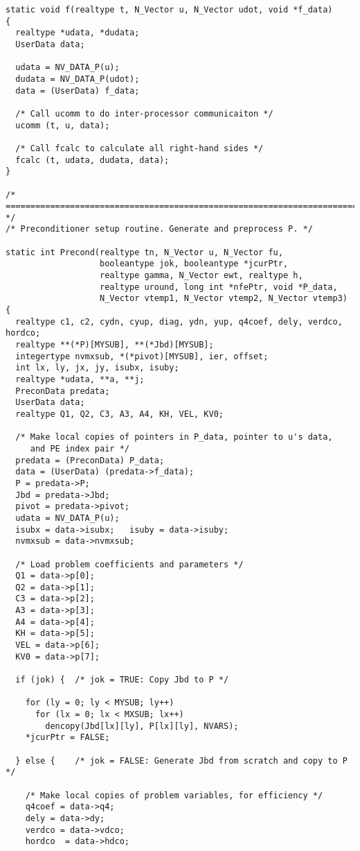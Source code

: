 \begin{verbatim}
static void f(realtype t, N_Vector u, N_Vector udot, void *f_data)
{
  realtype *udata, *dudata;
  UserData data;

  udata = NV_DATA_P(u);
  dudata = NV_DATA_P(udot);
  data = (UserData) f_data;

  /* Call ucomm to do inter-processor communicaiton */
  ucomm (t, u, data);

  /* Call fcalc to calculate all right-hand sides */
  fcalc (t, udata, dudata, data);
}

/* ======================================================================= */
/* Preconditioner setup routine. Generate and preprocess P. */

static int Precond(realtype tn, N_Vector u, N_Vector fu, 
                   booleantype jok, booleantype *jcurPtr, 
                   realtype gamma, N_Vector ewt, realtype h,
                   realtype uround, long int *nfePtr, void *P_data,
                   N_Vector vtemp1, N_Vector vtemp2, N_Vector vtemp3)
{
  realtype c1, c2, cydn, cyup, diag, ydn, yup, q4coef, dely, verdco, hordco;
  realtype **(*P)[MYSUB], **(*Jbd)[MYSUB];
  integertype nvmxsub, *(*pivot)[MYSUB], ier, offset;
  int lx, ly, jx, jy, isubx, isuby;
  realtype *udata, **a, **j;
  PreconData predata;
  UserData data;
  realtype Q1, Q2, C3, A3, A4, KH, VEL, KV0;

  /* Make local copies of pointers in P_data, pointer to u's data,
     and PE index pair */
  predata = (PreconData) P_data;
  data = (UserData) (predata->f_data);
  P = predata->P;
  Jbd = predata->Jbd;
  pivot = predata->pivot;
  udata = NV_DATA_P(u);
  isubx = data->isubx;   isuby = data->isuby;
  nvmxsub = data->nvmxsub;

  /* Load problem coefficients and parameters */
  Q1 = data->p[0];
  Q2 = data->p[1];
  C3 = data->p[2];
  A3 = data->p[3];
  A4 = data->p[4];
  KH = data->p[5];
  VEL = data->p[6];
  KV0 = data->p[7];

  if (jok) {  /* jok = TRUE: Copy Jbd to P */

    for (ly = 0; ly < MYSUB; ly++)
      for (lx = 0; lx < MXSUB; lx++)
        dencopy(Jbd[lx][ly], P[lx][ly], NVARS);
    *jcurPtr = FALSE;

  } else {    /* jok = FALSE: Generate Jbd from scratch and copy to P */

    /* Make local copies of problem variables, for efficiency */
    q4coef = data->q4;
    dely = data->dy;
    verdco = data->vdco;
    hordco  = data->hdco;
    

\end{verbatim}
